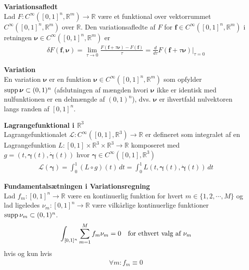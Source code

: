 
\begin{dfn} {\bf Variationsafledt}\\
Lad $F : C^\infty ([0,1]^n, \mathbb{R}^m) \to \mathbb{R}$ være et funktional over vektorrummet $C^\infty([0,1]^n, \mathbb{R}^m)$ over $\mathbb{R}$. Den variationsafledte af $F$ for $\mathbf{f}\in C^\infty ([0,1]^n, \mathbb{R}^m)$ i retningen ${\boldsymbol \nu}\in C^\infty ([0,1]^n, \mathbb{R}^m)$ er
\begin{align*}
\delta F(\mathbf{f}, {\boldsymbol \nu}) = \lim_{\tau \to 0} \frac{F(\mathbf{f}+\tau{\boldsymbol \nu})-F(\mathbf{f})}{\tau} = \frac{d}{d\tau} F(\mathbf{f}+\tau {\boldsymbol \nu}) \Big|_{\tau = 0}
\end{align*}
\end{dfn}


\begin{dfn} {\bf Variation}\\
En variation ${\boldsymbol \nu}$ er en funktion ${\boldsymbol \nu} \in C^\infty ([0,1]^n, \mathbb{R}^m)$ som opfylder $\textnormal{supp}\, {\boldsymbol \nu} \subset (0,1)^n$ (afslutningen af mængden hvori ${\boldsymbol \nu}$ ikke er identisk med nulfunktionen er en delmængde af $ (0,1)^n$), dvs. ${\boldsymbol \nu}$ er ihvertfald nulvektoren langs randen af $[0,1]^n$.
\end{dfn}


\begin{dfn} {\bf Lagrangefunktional i $\mathbb{R}^3$}\\
Lagrangefunktionalet $\mathscr{L} : C^\infty ([0,1], \mathbb{R}^3) \to \mathbb{R}$ er defineret som integralet af en Lagrangefunktion $L : [0,1] \times \mathbb{R}^3 \times \mathbb{R}^3 \to \mathbb{R}$ komposeret med $g=(t,{\boldsymbol \gamma}(t),\dot{\boldsymbol \gamma}(t))$ hvor ${\boldsymbol \gamma} \in C^\infty ([0,1], \mathbb{R}^3)$
\begin{align*}
\mathscr{L}({\boldsymbol \gamma})= \int_0^1 (L\circ g)(t) \, dt =\int_0^1 L(t, {\boldsymbol \gamma}(t),\dot{{\boldsymbol \gamma}}(t)) \, dt
\end{align*}
\end{dfn}


\begin{thm} {\bf Fundamentalsætningen i Variationsregning}\\
Lad $f_m : [0,1]^n \to \mathbb{R}$ være en kontinuerlig funktion for hvert $m \in \{1, 2, \cdots, M \}$ og lad ligeledes $\nu_m : [0,1]^n \to \mathbb{R}$ være vilkårlige kontinuerlige funktioner $\textnormal{supp}\, \nu_m \subset (0,1)^n$.
\begin{align*}
\int_{[0,1]^n} \sum_{m=1}^M f_m \nu_m = 0 \quad \textnormal{for ethvert valg af $\nu_m$}
\end{align*}
hvis og kun hvis 
\begin{align*}
\forall m : f_m \equiv 0
\end{align*}
\end{thm}


